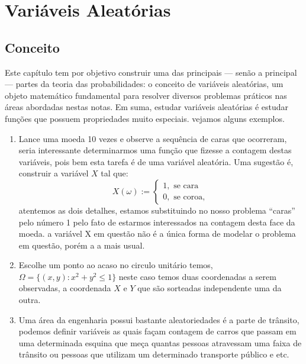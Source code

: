 \chapter{Variáveis Aleatórias}
\section{Conceito}

 Este capítulo tem por objetivo construir uma das principais — senão a principal — partes da teoria das probabilidades: o conceito de variáveis aleatórias, um objeto matemático fundamental para resolver diversos problemas práticos nas áreas abordadas nestas notas. Em suma, estudar variáveis aleatórias é estudar funções que possuem propriedades muito especiais. vejamos alguns exemplos.\\

\exemplo
    \begin{enumerate}
        \item [(i)]
    Lance uma moeda 10 vezes e observe a sequência de caras que ocorreram, seria interessante determinarmos uma função que fizesse a contagem destas variáveis, pois bem esta tarefa é de uma variável aleatória. Uma sugestão é, construir a variável $X$ tal que:
    \begin{equation}
    \label{01}
        X(\omega):= \begin{cases}
            1,\,\,\text{se cara}\\
            0,\,\,\text{se coroa}, 
        \end{cases}
    \end{equation}
    atentemos as dois detalhes, estamos substituindo no nosso problema ``caras''  pelo número 1 pelo fato de estarmos interessados na contagem desta face da moeda. a variável X em questão não é a única forma de modelar o problema em questão, porém a a mais usual.
    \item[(ii)] Escolhe um ponto ao acaso no circulo unitário temos, $\Omega = \{(x,y): x^2 + y^2 \leq 1\}$ neste caso temos duas coordenadas a serem observadas, a coordenada $X$ e $Y$ que são sorteadas independente uma da outra.
    \item[(iii)] Uma área da engenharia possui bastante aleatoriedades é a parte de trânsito, podemos definir variáveis as quais façam contagem de carros que passam em uma determinada esquina que meça quantas pessoas atravessam uma faixa de trânsito ou pessoas que utilizam um determinado transporte público e etc. 
    \end{enumerate}

